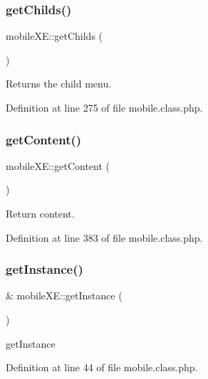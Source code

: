 \subsubsection{\texorpdfstring{get\+Childs()}{getChilds()}}
{\footnotesize\ttfamily mobile\+X\+E\+::get\+Childs (\begin{DoxyParamCaption}{ }\end{DoxyParamCaption})}



Returns the child menu. 



Definition at line 275 of file mobile.\+class.\+php.

\mbox{\label{classmobileXE_aef1ad977cdc5f504ddafd1c6c6272cc1}} 
\subsubsection{\texorpdfstring{get\+Content()}{getContent()}}
{\footnotesize\ttfamily mobile\+X\+E\+::get\+Content (\begin{DoxyParamCaption}{ }\end{DoxyParamCaption})}



Return content. 



Definition at line 383 of file mobile.\+class.\+php.

\mbox{\label{classmobileXE_a11db662f7f05a929e2559ee6d42fca2c}} 
\subsubsection{\texorpdfstring{get\+Instance()}{getInstance()}}
{\footnotesize\ttfamily \& mobile\+X\+E\+::get\+Instance (\begin{DoxyParamCaption}{ }\end{DoxyParamCaption})}



get\+Instance 



Definition at line 44 of file mobile.\+class.\+php.

\mbox{\label{classmobileXE_a482a65d3f684a18d5769f9951ac2741e}} 
